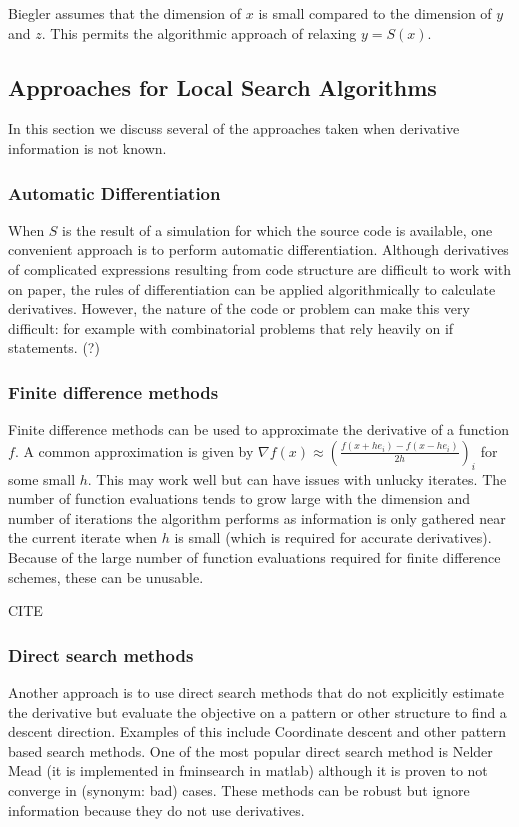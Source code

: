 \documentclass{article}
\begin{document}
Biegler assumes that the dimension of $x$ is small compared to the dimension of $y$ and $z$.
This permits the algorithmic approach of relaxing $y=S(x)$.

\subsection{Approaches for Local Search Algorithms}

In this section we discuss several of the approaches taken when derivative information is not known.

\subsubsection{Automatic Differentiation}

When $S$ is the result of a simulation for which the source code is available, one convenient approach is to perform automatic differentiation.
Although derivatives of complicated expressions resulting from code structure are difficult to work with on paper, the rules of differentiation can be applied algorithmically to calculate derivatives.
However, the nature of the code or problem can make this very difficult: for example with combinatorial problems that rely heavily on if statements.
(?)

\subsubsection{Finite difference methods}
Finite difference methods can be used to approximate the derivative of a function $f$.
A common approximation is given by $\nabla f(x) \approx (\frac{f(x+he_i) - f(x-he_i)}{2h})_i$ for some small $h$.
This may work well but can have issues with unlucky iterates.
The number of function evaluations tends to grow large with the dimension and number of iterations the algorithm performs as information is only gathered near the current iterate when $h$ is small (which is required for accurate derivatives).
Because of the large number of function evaluations required for finite difference schemes, these can be unusable.

CITE

\subsubsection{Direct search methods}

Another approach is to use direct search methods that do not explicitly estimate the derivative but evaluate the objective on a pattern or other structure to find a descent direction.
Examples of this include Coordinate descent and other pattern based search methods.
One of the most popular direct search method is Nelder Mead (it is implemented in fminsearch in matlab) although it is proven to not converge in (synonym: bad) cases.
These methods can be robust but ignore information because they do not use derivatives.
\end{document}
